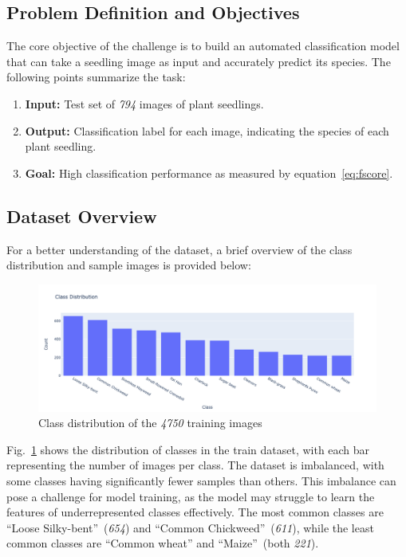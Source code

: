 \subsection{Problem Definition and Objectives}
The core objective of the challenge is to build an automated classification model that can take a seedling image as input and accurately predict its species. The following points summarize the task:

\begin{enumerate}
    \item \textbf{Input:} Test set of \textit{794} images of plant seedlings.
    \item \textbf{Output:} Classification label for each image, indicating the species of each plant seedling.
    \item \textbf{Goal:} High classification performance as measured by equation~\ref{eq:fscore}.
\end{enumerate}

\subsection{Dataset Overview}
For a better understanding of the dataset, a brief overview of the class distribution and sample images is provided below:

\begin{figure}[htbp]
    \centerline{\includegraphics[width=0.9\linewidth]{../../resources/class_distribution.png}}
    \caption{Class distribution of the \textit{4750} training images}
    \label{fig:class-distribution}
\end{figure}

Fig.~\ref{fig:class-distribution} shows the distribution of classes in the train dataset, with each bar representing the number of images per class. The dataset is imbalanced, with some classes having significantly fewer samples than others. This imbalance can pose a challenge for model training, as the model may struggle to learn the features of underrepresented classes effectively. The most common classes are ``Loose Silky-bent''~(\textit{654}) and ``Common Chickweed''~(\textit{611}), while the least common classes are ``Common wheat'' and ``Maize''~(both \textit{221}).

